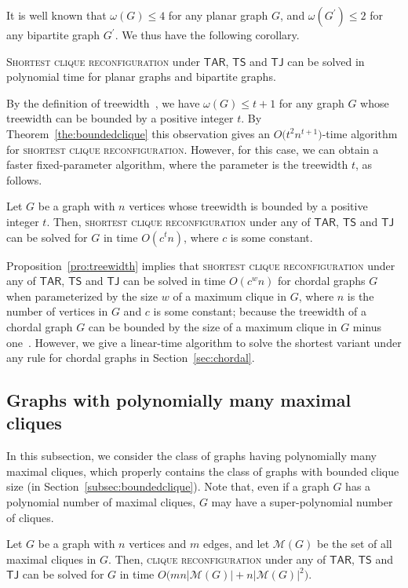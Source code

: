 \documentclass{llncs}
\newcommand{\TS}{\mathsf{TS}}
\newcommand{\TJ}{\mathsf{TJ}}
\newcommand{\TARrule}{\mathsf{TAR}}
\newcommand{\Mset}[1]{\mathcal{M}(#1)}
\newcounter{one}
\begin{document}
	It is well known that $\omega(G) \le 4$ for any planar graph $G$, and $\omega(G^\prime) \le 2$ for any bipartite graph $G^\prime$.
	We thus have the following corollary. 
	\begin{corollary}
	\textsc{Shortest clique reconfiguration} under $\TARrule$, $\TS$ and $\TJ$ can be solved in polynomial time for planar graphs and bipartite graphs.
	\end{corollary}
	
	By the definition of treewidth~\cite{BodlaenderDDFLP13}, we have $\omega(G) \le t+1$ for any graph $G$ whose treewidth can be bounded by a positive integer $t$.
	By Theorem~\ref{the:boundedclique} this observation gives an $O \bigl(t^2 n^{t+1} \bigr)$-time algorithm for \textsc{shortest clique reconfiguration}.
	However, for this case, we can obtain a faster fixed-parameter algorithm, where the parameter is the treewidth $t$, as follows.
	\begin{proposition} \label{pro:treewidth}
	Let $G$ be a graph with $n$ vertices whose treewidth is bounded by a positive integer $t$.
	Then, \textsc{shortest clique reconfiguration} under any of $\TARrule$, $\TS$ and $\TJ$ can be solved for $G$ in time $O(c^{t} n)$, where $c$ is some constant.
	\end{proposition}

	Proposition~\ref{pro:treewidth} implies that \textsc{shortest clique reconfiguration} under any of $\TARrule$, $\TS$ and $\TJ$ can be solved in time $O(c^{w} n)$ for chordal graphs $G$ when parameterized by the size $w$ of a maximum clique in $G$, where $n$ is the number of vertices in $G$ and $c$ is some constant; because the treewidth of a chordal graph $G$ can be bounded by the size of a maximum clique in $G$ minus one~\cite{RS86}. 
	However, we give a linear-time algorithm to solve the shortest variant under any rule for chordal graphs in Section~\ref{sec:chordal}.


	\subsection{Graphs with polynomially many maximal cliques}
	\label{subsec:polymany}
	
	In this subsection, we consider the class of graphs having polynomially many maximal cliques, which properly contains the class of graphs with bounded clique size (in Section~\ref{subsec:boundedclique}). 
	Note that, even if a graph $G$ has a polynomial number of maximal cliques, $G$ may have a super-polynomial number of cliques. 
\begin{theorem} \label{the:poly-many-maxcliques}
	Let $G$ be a graph with $n$ vertices and $m$ edges, and let $\Mset{G}$ be the set of all maximal cliques in $G$. 
	Then, \textsc{clique reconfiguration} under any of $\TARrule$, $\TS$ and $\TJ$ can be solved for $G$ in time $O \bigl(m n \lvert \mathcal{M}(G) \rvert + n \lvert \mathcal{M}(G) \rvert^{2} \bigr)$.
	\end{theorem}
\end{document}
